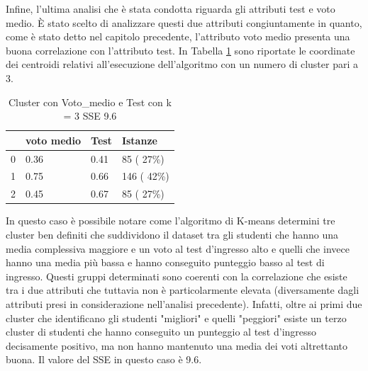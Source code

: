 \documentclass[12pt]{article}
\begin{document}
Infine, l'ultima analisi che è stata condotta riguarda gli attributi test e voto medio. È stato scelto di analizzare 
questi due attributi congiuntamen\-te in quanto, come è stato detto nel capitolo precedente, l'attributo voto medio 
presenta una buona correlazione con l'attributo test. 
In Tabella \ref{c3MT} sono riportate le coordinate dei centroidi relativi all'esecuzione dell'algori\-tmo con un numero di cluster pari a 3.
\begin{table}[ht]
	\centering
	\begin{tabular}{@{}llll@{}}
	\toprule
	  & voto medio & Test  & Istanze\\ \midrule
	0 & 0.36       & 0.41  & 85  ( 27\%)\\
	1 & 0.75       & 0.66  & 146 ( 42\%)\\
	2 & 0.45       & 0.67  & 85  ( 27\%)\\ \bottomrule
	\end{tabular}
	\caption{Cluster con Voto\_medio e Test con k = 3 SSE 9.6}
	\label{c3MT}
\end{table}
In questo caso è possibile notare come
l'algoritmo di K-means determini tre cluster ben definiti che suddi\-vidono il dataset tra gli studenti che hanno una
media complessiva mag\-giore e un voto al test d'ingresso alto e quelli che invece hanno una media più bassa e 
hanno conseguito punteggio basso al test di ingresso. Questi gruppi determinati sono coerenti con la correlazione 
che esiste tra i due attributi che tuttavia non è particolarmente elevata (diversamente dagli attributi presi in 
considerazione nell'analisi precedente). Infatti, oltre ai primi due cluster che identificano gli studenti "migliori"
e quelli "peggiori" esiste un terzo cluster di studenti che hanno conseguito un punteggio al test d'ingresso decisamente
positivo, ma non hanno mantenuto una media dei voti altrettanto buona. Il valore del SSE in questo caso è 9.6. 
\end{document}
